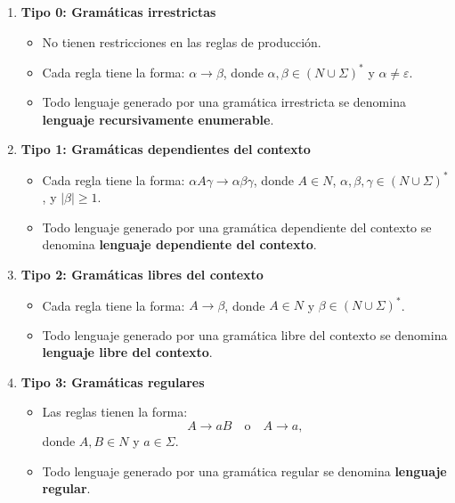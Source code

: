 \documentclass[12pt]{article}
\begin{document}
\begin{enumerate}
      \item \textbf{Tipo 0: Gramáticas irrestrictas}
            \begin{itemize}
                  \item No tienen restricciones en las reglas de producción.
                  \item Cada regla tiene la forma: \(\alpha \to \beta\), donde \(\alpha, \beta \in (N \cup \Sigma)^*\) y \(\alpha \neq \varepsilon\).
                  \item Todo lenguaje generado por una gramática irrestricta se denomina \textbf{lenguaje recursivamente enumerable}.
            \end{itemize}
            
      \item \textbf{Tipo 1: Gramáticas dependientes del contexto}
            \begin{itemize}
                  \item Cada regla tiene la forma: \(\alpha A \gamma \to \alpha \beta \gamma\), donde \(A \in N\), \(\alpha, \beta, \gamma \in (N \cup \Sigma)^*\), y \(|\beta| \geq 1\).
                  \item Todo lenguaje generado por una gramática dependiente del contexto se denomina \textbf{lenguaje dependiente del contexto}.
            \end{itemize}
            
      \item \textbf{Tipo 2: Gramáticas libres del contexto}
            \begin{itemize}
                  \item Cada regla tiene la forma: \(A \to \beta\), donde \(A \in N\) y \(\beta \in (N \cup \Sigma)^*\).
                  \item Todo lenguaje generado por una gramática libre del contexto se denomina \textbf{lenguaje libre del contexto}.
            \end{itemize}
            
      \item \textbf{Tipo 3: Gramáticas regulares}
            \begin{itemize}
                  \item Las reglas tienen la forma:
                        \[
                              A \to aB \quad \text{o} \quad A \to a,
                        \]
                        donde \(A, B \in N\) y \(a \in \Sigma\).
                  \item Todo lenguaje generado por una gramática regular se denomina \textbf{lenguaje regular}.
            \end{itemize}
\end{enumerate}
\end{document}
